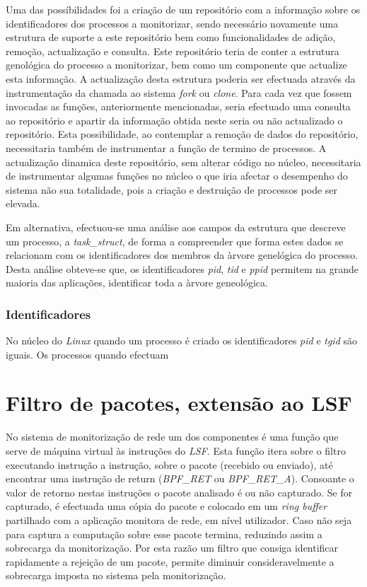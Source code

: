 Uma das possíbilidades foi a criação de um repositório com a informação sobre os identificadores dos processos a monitorizar, sendo necessário novamente uma estrutura de suporte a este repositório bem como funcionalidades de adição, remoção, actualização e consulta.
Este repositório teria de conter a estrutura genológica do processo a monitorizar, bem como um componente que actualize esta informação.
A actualização desta estrutura poderia ser efectuada através da instrumentação da chamada ao sistema \textit{fork} ou \textit{clone}.
Para cada vez que fossem invocadas as funções, anteriormente mencionadas, seria efectuado uma consulta ao repositório e apartir da informação obtida neste seria ou não actualizado o repositório.
Esta possibilidade, ao contemplar a remoção de dados do repositório, necessitaria também de instrumentar a função de termino de processos.
A actualização dinamica deste repositório, sem alterar código no núcleo, necessitaria de instrumentar algumas funções no núcleo o que iria afectar o desempenho do sistema não sua totalidade, pois a criação e destruição de processos pode ser elevada.

Em alternativa, efectuou-se uma análise aos campos da estrutura que descreve um processo, a \textit{task\_struct}, de forma a compreender que forma estes dados se relacionam com os identificadores dos membros da àrvore genelógica do processo.
Desta análise obteve-se que, os identificadores \textit{pid}, \textit{tid} e \textit{ppid} permitem na grande maioria das aplicações, identificar toda a àrvore geneológica.


\subsubsection{Identificadores}

No núcleo do \textit{Linux} quando um processo é criado os identificadores \textit{pid} e \textit{tgid} são iguais.
Os processos quando efectuam

\section{Filtro de pacotes, extensão ao LSF}

No sistema de monitorização de rede um dos componentes é uma função que serve de máquina virtual às instruções do \textit{LSF}.
Esta função itera sobre o filtro executando instrução a instrução, sobre o pacote (recebido ou enviado), até encontrar uma instrução de return (\textit{BPF\_RET} ou \textit{BPF\_RET\_A}).
Consoante o valor de retorno nestas instruções o pacote analisado é ou não capturado.
Se for capturado, é efectuada uma cópia do pacote e colocado em um \textit{ring buffer} partilhado com a aplicação monitora de rede, em nível utilizador.
Caso não seja para captura a computação sobre esse pacote termina, reduzindo assim a sobrecarga da monitorização.
Por esta razão um filtro que consiga identificar rapidamente a rejeição de um pacote, permite diminuir consideravelmente a sobrecarga imposta no sistema pela monitorização.


